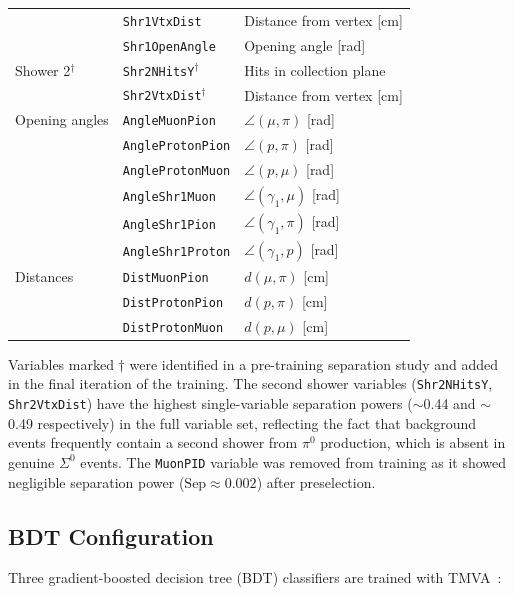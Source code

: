 \documentclass[12pt,a4paper]{article}
\begin{document}
\begin{table}[H]
\begin{tabular}{lll}
      & \texttt{Shr1VtxDist}     & Distance from vertex [cm] \\
      & \texttt{Shr1OpenAngle}   & Opening angle [rad] \\
    \midrule
    Shower 2$^\dagger$
      & \texttt{Shr2NHitsY}$^\dagger$ & Hits in collection plane \\
      & \texttt{Shr2VtxDist}$^\dagger$ & Distance from vertex [cm] \\
    \midrule
    Opening angles
      & \texttt{AngleMuonPion}   & $\angle(\mu,\pi)$ [rad] \\
      & \texttt{AngleProtonPion} & $\angle(p,\pi)$ [rad] \\
      & \texttt{AngleProtonMuon} & $\angle(p,\mu)$ [rad] \\
      & \texttt{AngleShr1Muon}   & $\angle(\gamma_1,\mu)$ [rad] \\
      & \texttt{AngleShr1Pion}   & $\angle(\gamma_1,\pi)$ [rad] \\
      & \texttt{AngleShr1Proton} & $\angle(\gamma_1,p)$ [rad] \\
    \midrule
    Distances
      & \texttt{DistMuonPion}    & $d(\mu,\pi)$ [cm] \\
      & \texttt{DistProtonPion}  & $d(p,\pi)$ [cm] \\
      & \texttt{DistProtonMuon}  & $d(p,\mu)$ [cm] \\
    \bottomrule
  \end{tabular}
\end{table}

Variables marked $\dagger$ were identified in a pre-training separation
study and added in the final iteration of the training.  The second
shower variables (\texttt{Shr2NHitsY}, \texttt{Shr2VtxDist}) have the
highest single-variable separation powers ($\sim$0.44 and $\sim$0.49
respectively) in the full variable set, reflecting the fact that
background events frequently contain a second shower from $\pi^0$
production, which is absent in genuine $\Sigma^0$ events.
The \texttt{MuonPID} variable was removed from training as it showed
negligible separation power ($\text{Sep}\approx 0.002$) after preselection.

\subsection{BDT Configuration}

Three gradient-boosted decision tree (BDT) classifiers are trained with
TMVA~\cite{Hocker:2007ht}:
\end{document}
